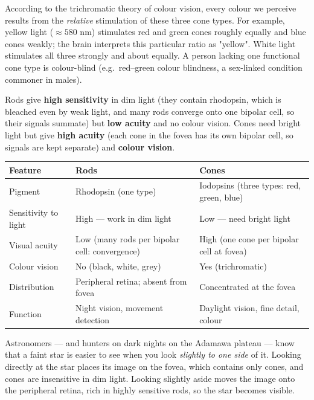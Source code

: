 \documentclass[11pt]{article}
\newcommand{\cle}[1]{{\popxbold\color{popdark}#1}}
\newcounter{popsec}
\newcounter{popsub}
\newcommand{\courssub}[1]{%
  \stepcounter{popsub}%
  \par\vspace{9pt}\noindent{\popxbold\fontsize{11.5}{13}\selectfont\color{popink}{\color{poporange}\thepopsec.\thepopsub}\hspace{6pt}#1}\par\nopagebreak\vspace{4pt}
}
\begin{document}
According to the \cle{trichromatic theory} of colour vision, every colour we perceive results from the \emph{relative} stimulation of these three cone types. For example, yellow light ($\approx 580$ nm) stimulates red and green cones roughly equally and blue cones weakly; the brain interprets this particular ratio as "yellow". White light stimulates all three strongly and about equally. A person lacking one functional cone type is \cle{colour-blind} (e.g.\ red–green colour blindness, a sex-linked condition commoner in males).

\courssub{Rods versus Cones}

\begin{propriete}
\cle{Rods} give \textbf{high sensitivity} in dim light (they contain rhodopsin, which is bleached even by weak light, and many rods converge onto one bipolar cell, so their signals summate) but \textbf{low acuity} and no colour vision. \cle{Cones} need bright light but give \textbf{high acuity} (each cone in the fovea has its own bipolar cell, so signals are kept separate) and \textbf{colour vision}.
\end{propriete}

\begin{aretenir}
\begin{center}
\begin{tabularx}{\linewidth}{|l|X|X|}
\hline
\rowcolor{popblueL} \textbf{Feature} & \textbf{Rods} & \textbf{Cones} \\
\hline
Pigment & Rhodopsin (one type) & Iodopsins (three types: red, green, blue) \\
\hline
Sensitivity to light & High — work in dim light & Low — need bright light \\
\hline
Visual acuity & Low (many rods per bipolar cell: convergence) & High (one cone per bipolar cell at fovea) \\
\hline
Colour vision & No (black, white, grey) & Yes (trichromatic) \\
\hline
Distribution & Peripheral retina; absent from fovea & Concentrated at the fovea \\
\hline
Function & Night vision, movement detection & Daylight vision, fine detail, colour \\
\hline
\end{tabularx}
\end{center}
\end{aretenir}

\begin{exemplebox}
Astronomers — and hunters on dark nights on the Adamawa plateau — know that a faint star is easier to see when you look \emph{slightly to one side} of it. Looking directly at the star places its image on the \cle{fovea}, which contains only cones, and cones are insensitive in dim light. Looking slightly aside moves the image onto the peripheral retina, rich in highly sensitive rods, so the star becomes visible.
\end{exemplebox}
\end{document}
